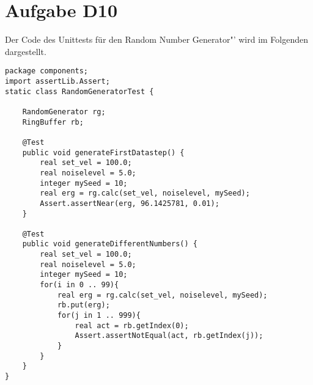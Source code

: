 
\chapter{Aufgabe D10}

Der Code des Unittests für den \glqq Random Number Generator"' wird im Folgenden dargestellt.

\begin{lstlisting}
package components;
import assertLib.Assert;
static class RandomGeneratorTest {
	
	RandomGenerator rg;
	RingBuffer rb;
	
	@Test
	public void generateFirstDatastep() {
		real set_vel = 100.0;
		real noiselevel = 5.0;
		integer mySeed = 10;
		real erg = rg.calc(set_vel, noiselevel, mySeed);
		Assert.assertNear(erg, 96.1425781, 0.01);
	}
	
	@Test
	public void generateDifferentNumbers() {
		real set_vel = 100.0;
		real noiselevel = 5.0;
		integer mySeed = 10;
		for(i in 0 .. 99){
			real erg = rg.calc(set_vel, noiselevel, mySeed);
			rb.put(erg);
			for(j in 1 .. 999){
				real act = rb.getIndex(0);
				Assert.assertNotEqual(act, rb.getIndex(j));
			}
		}
	}
}
\end{lstlisting}